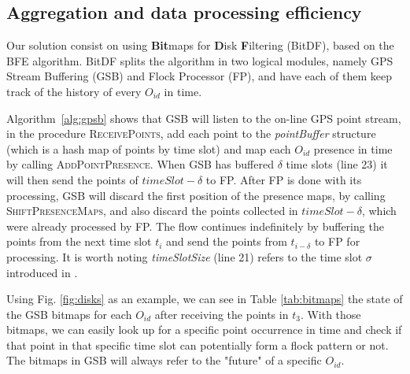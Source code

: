 \subsection{Aggregation and data processing efficiency}
Our solution consist on using \textbf{Bit}maps for \textbf{D}isk \textbf{F}iltering (BitDF), based on the BFE algorithm.
BitDF splits the algorithm in two logical modules, namely GPS Stream Buffering (GSB) and Flock Processor (FP), and have
each of them keep track of the history of every $O_{id}$ in time.

Algorithm~\ref{alg:gpsb} shows that GSB will listen to the on-line GPS point stream, in the procedure
\textsc{ReceivePoints}, add each point to the \textit{pointBuffer} structure (which is a hash map of points by time
slot) and map each $O_{id}$ presence in time by calling \textsc{AddPointPresence}. When GSB has buffered $\delta$ time
slots (line 23) it will then send the points of $timeSlot - \delta$ to FP. After FP is done with its processing, GSB
will discard the first position of the presence maps, by calling \textsc{ShiftPresenceMaps}, and also discard the points
collected in $timeSlot - \delta$, which were already processed by FP. The flow continues indefinitely by buffering the
points from the next time slot $t_i$ and send the points from $t_{i - \delta}$ to FP for processing. It is worth noting
\textit{timeSlotSize} (line 21) refers to the time slot $\sigma$ introduced in .

Using Fig. \ref{fig:disks} as an example, we can see in Table \ref{tab:bitmaps} the state of the GSB bitmaps for each
$O_{id}$ after receiving the points in $t_3$. With those bitmaps, we can easily look up for a specific point occurrence
in time and check if that point in that specific time slot can potentially form a flock pattern or not. The bitmaps in
GSB will always refer to the "future" of a specific $O_{id}$.


